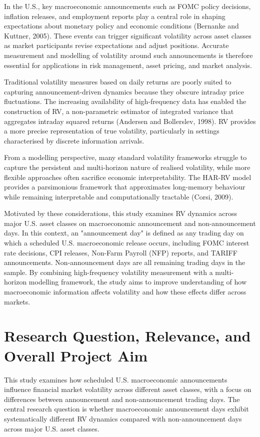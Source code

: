 \documentclass[12pt,a4paper]{report}
\begin{document}
In the U.S., key macroeconomic announcements such as FOMC policy decisions, inflation releases, and employment reports play a central role in shaping expectations about monetary policy and economic conditions (Bernanke and Kuttner, 2005). These events can trigger significant volatility across asset classes as market participants revise expectations and adjust positions. Accurate measurement and modelling of volatility around such announcements is therefore essential for applications in risk management, asset pricing, and market analysis.

Traditional volatility measures based on daily returns are poorly suited to capturing announcement-driven dynamics because they obscure intraday price fluctuations. The increasing availability of high-frequency data has enabled the construction of RV, a non-parametric estimator of integrated variance that aggregates intraday squared returns (Andersen and Bollerslev, 1998). RV provides a more precise representation of true volatility, particularly in settings characterised by discrete information arrivals.

From a modelling perspective, many standard volatility frameworks struggle to capture the persistent and multi-horizon nature of realised volatility, while more flexible approaches often sacrifice economic interpretability. The HAR-RV model provides a parsimonious framework that approximates long-memory behaviour while remaining interpretable and computationally tractable (Corsi, 2009).

Motivated by these considerations, this study examines RV dynamics across major U.S. asset classes on macroeconomic announcement and non-announcement days. In this context, an "announcement day" is defined as any trading day on which a scheduled U.S. macroeconomic release occurs, including FOMC interest rate decisions, CPI releases, Non-Farm Payroll (NFP) reports, and TARIFF announcements. Non-announcement days are all remaining trading days in the sample. By combining high-frequency volatility measurement with a multi-horizon modelling framework, the study aims to improve understanding of how macroeconomic information affects volatility and how these effects differ across markets.

\section{Research Question, Relevance, and Overall Project Aim}
This study examines how scheduled U.S. macroeconomic announcements influence financial market volatility across different asset classes, with a focus on differences between announcement and non-announcement trading days. The central research question is whether macroeconomic announcement days exhibit systematically different RV dynamics compared with non-announcement days across major U.S. asset classes.
\end{document}
